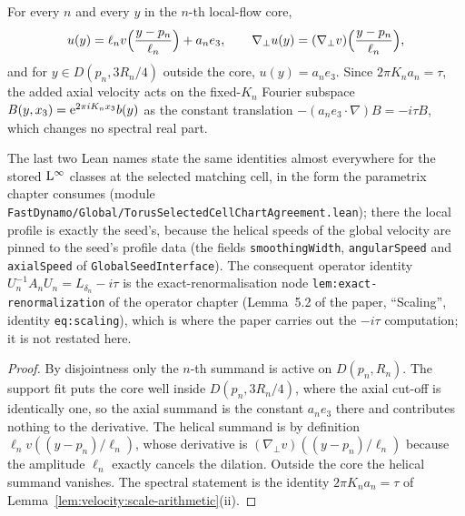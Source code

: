 \begin{lemma}
  \label{lem:velocity:matching-cell}
  \leanok
  For every $n $ and every $y $ in the $n $-th local-flow core,
  \[
    u(y)=\ell_nv\Bigl(\frac{y-p_n}{\ell_n}\Bigr)+a_ne_3,
    \qquad
    \nabla_\perp u(y)=(\nabla_\perp v)\Bigl(\frac{y-p_n}{\ell_n}\Bigr),
  \]
  and for $y\in D(p_n,3R_n/4) $ outside the core, $u(y)=a_ne_3 $.  Since $2\pi K_na_n=\tau $,
  the added axial velocity acts on the fixed-$K_n $ Fourier subspace
  $B(y,x_3)=\mathrm{e}^{2\pi iK_nx_3}b(y) $ as the constant translation
  $-(a_ne_3\cdot\nabla)B=-i\tau B $, which changes no spectral real part.
\end{lemma}

The last two Lean names state the same identities almost everywhere for the stored
$\mathrm{L}^\infty $ classes at the selected matching cell, in the form the parametrix chapter
consumes (module \texttt{FastDynamo/Global/TorusSelectedCellChartAgreement.lean}); there
the local profile is exactly the seed's, because the helical speeds of the global
velocity are pinned to the seed's profile data (the fields \texttt{smoothingWidth},
\texttt{angularSpeed} and \texttt{axialSpeed} of \texttt{GlobalSeedInterface}).  The consequent operator identity
$U_n^{-1}A_nU_n=L_{\delta_n}-i\tau $ is the exact-renormalisation node
\texttt{lem:exact-renormalization} of the operator chapter (Lemma~5.2 of the paper,
``Scaling'', identity \texttt{eq:scaling}), which is where the paper carries out the
$-i\tau $ computation; it is not restated here.

\begin{proof}
  \leanok
  By disjointness only the $n $-th summand is active on $D(p_n,R_n) $.  The support fit puts
  the core well inside $D(p_n,3R_n/4) $, where the axial cut-off is identically one, so the
  axial summand is the constant $a_ne_3 $ there and contributes nothing to the derivative.
  The helical summand is by definition $\ell_nv((y-p_n)/\ell_n) $, whose derivative is
  $(\nabla_\perp v)((y-p_n)/\ell_n) $ because the amplitude $\ell_n $ exactly cancels the
  dilation.  Outside the core the helical summand vanishes.  The spectral statement is the
  identity $2\pi K_na_n=\tau $ of Lemma~\ref{lem:velocity:scale-arithmetic}(ii).
\end{proof}

